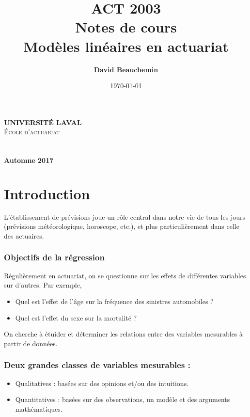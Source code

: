 \documentclass[11pt,french]{report}
\title{ACT 2003 \\ Notes de cours \\ Modèles linéaires en actuariat}
\author{\textbf{David Beauchemin}}
\date{\today}
\def\versionnumber{Automne 2017}
\begin{document}


\makeatletter
  \begin{titlepage}
  \centering
      {\large \textbf{\textsc{UNIVERSITÉ LAVAL}}}\\
      \textsc{École d'actuariat}\\
    \vspace{2cm}
    \vspace{2cm}
      {\LARGE \textbf{\@title}} \\
    \vfill
       {\large \@author} \\
    \vspace{8cm}
        {\large\textbf{\versionnumber}}\\
    \vfill
  \end{titlepage}
\makeatother


\pagebreak




\tableofcontents

\newpage


\chapter{Introduction}
L'établissement de prévisions joue un rôle central dans notre vie de tous les jours (prévisions météorologique, horoscope, etc.), et plus particulièrement dans celle des actuaires.

\subsection*{Objectifs de la régression}
Régulièrement en actuariat, on se questionne sur les effets de différentes variables sur d'autres. Par exemple,
\begin{itemize}
\item Quel est l'effet de l'âge sur la fréquence des sinistres automobiles ?
\item Quel est l'effet du sexe sur la mortalité ?
\end{itemize}

On cherche à étuider et déterminer les relations entre des variables mesurables à partir de données.

\subsection*{Deux grandes classes de variables mesurables :}
\begin{itemize}
\item Qualitatives : basées sur des opinions et/ou des intuitions.
\item Quantitatives : basées sur des observations, un modèle et des arguments mathématiques.
\end{itemize}
\end{document}
